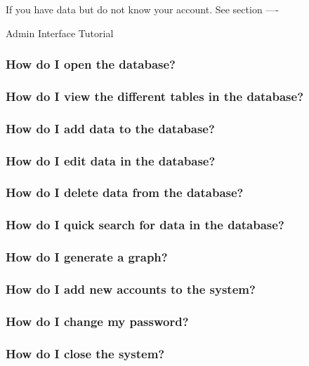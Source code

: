 If you have data but do not know your account. See section ----

Admin Interface Tutorial

\subsubsection{How do I open the database?}

\subsubsection{How do I view the different tables in the database?}

\subsubsection{How do I add data to the database?}

\subsubsection{How do I edit data in the database?}

\subsubsection{How do I delete data from the database?}

\subsubsection{How do I quick search for data in the database?}

\subsubsection{How do I generate a graph?}

\subsubsection{How do I add new accounts to the system?}

\subsubsection{How do I change my password?}

\subsubsection{How do I close the system?}

